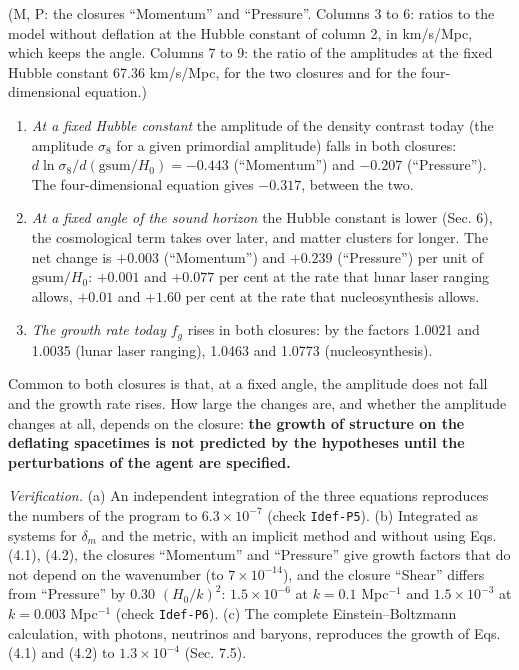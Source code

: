 \documentclass[
  10pt,
]{article}
\providecommand{\tightlist}{%
  \setlength{\itemsep}{0pt}\setlength{\parskip}{0pt}}
\begin{document}
(M, P: the closures ``Momentum'' and ``Pressure''. Columns 3 to 6:
ratios to the model without deflation at the Hubble constant of column
2, in km/s/Mpc, which keeps the angle. Columns 7 to 9: the ratio of the
amplitudes at the fixed Hubble constant 67.36 km/s/Mpc, for the two
closures and for the four-dimensional equation.)

\begin{enumerate}
\def\labelenumi{\arabic{enumi}.}
\tightlist
\item
  \emph{At a fixed Hubble constant} the amplitude of the density
  contrast today (the amplitude \(\sigma_8\) for a given primordial
  amplitude) falls in both closures:
  \(d\ln\sigma_8/d(\mathrm{gsum}/H_0)=-0.443\) (``Momentum'') and
  \(-0.207\) (``Pressure''). The four-dimensional equation gives
  \(-0.317\), between the two.
\item
  \emph{At a fixed angle of the sound horizon} the Hubble constant is
  lower (Sec. 6), the cosmological term takes over later, and matter
  clusters for longer. The net change is \(+0.003\) (``Momentum'') and
  \(+0.239\) (``Pressure'') per unit of \(\mathrm{gsum}/H_0\):
  \(+0.001\) and \(+0.077\) per cent at the rate that lunar laser
  ranging allows, \(+0.01\) and \(+1.60\) per cent at the rate that
  nucleosynthesis allows.
\item
  \emph{The growth rate today} \(f_g\) rises in both closures: by the
  factors 1.0021 and 1.0035 (lunar laser ranging), 1.0463 and 1.0773
  (nucleosynthesis).
\end{enumerate}

Common to both closures is that, at a fixed angle, the amplitude does
not fall and the growth rate rises. How large the changes are, and
whether the amplitude changes at all, depends on the closure:
\textbf{the growth of structure on the deflating spacetimes is not
predicted by the hypotheses until the perturbations of the agent are
specified.}

\emph{Verification.} (a) An independent integration of the three
equations reproduces the numbers of the program to \(6.3\times10^{-7}\)
(check \texttt{Idef-P5}). (b) Integrated as systems for \(\delta_m\) and
the metric, with an implicit method and without using Eqs. (4.1), (4.2),
the closures ``Momentum'' and ``Pressure'' give growth factors that do
not depend on the wavenumber (to \(7\times10^{-14}\)), and the closure
``Shear'' differs from ``Pressure'' by 0.30 \((H_0/k)^2\):
\(1.5\times10^{-6}\) at \(k=0.1\) Mpc\(^{-1}\) and \(1.5\times10^{-3}\)
at \(k=0.003\) Mpc\(^{-1}\) (check \texttt{Idef-P6}). (c) The complete
Einstein--Boltzmann calculation, with photons, neutrinos and baryons,
reproduces the growth of Eqs. (4.1) and (4.2) to \(1.3\times10^{-4}\)
(Sec. 7.5).
\end{document}
